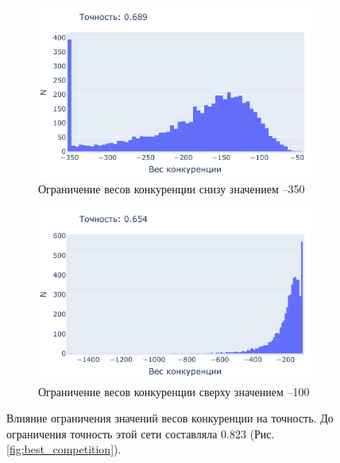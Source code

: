 \documentclass[a4paper]{article}
\begin{document}
\begin{figure}[H]
\centering

\begin{subfigure}{0.45\textwidth}
    \includegraphics[width=\textwidth,keepaspectratio=true]{competition_distribution_clamp_low_ru.pdf}
    \caption{Ограничение весов конкуренции снизу значением --350} 
\end{subfigure}
\begin{subfigure}{0.45\textwidth}
    \includegraphics[width=\textwidth,keepaspectratio=true]{competition_distribution_clamp_high_ru.pdf}
    \caption{Ограничение весов конкуренции сверху значением --100}
\end{subfigure} 
\caption{Влияние ограничения значений весов конкуренции на точность. До ограничения точность этой сети составляла 0.823 (Рис. \ref{fig:best_competition}).}
\end{figure}
\end{document}
